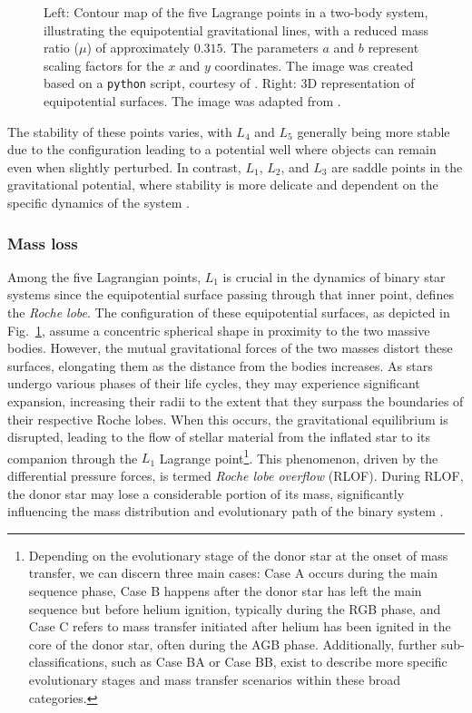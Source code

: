 \documentclass[main.tex]{subfiles}
\begin{document}
\begin{figure}[t!]
\begin{subfigure}{0.535\textwidth}
         \end{subfigure}
         \caption{Left: Contour map of the five Lagrange points in a two-body system, illustrating the equipotential gravitational lines, with a reduced mass ratio ($\mu$) of approximately $0.315$. The parameters $a$ and $b$ represent scaling factors for the $x$ and $y$ coordinates. The image was created based on a \texttt{python} script, courtesy of \cite{Zingale}.
         Right: 3D representation of equipotential surfaces. The image was adapted from \cite{Sluijs}.}
         \label{fig:eq_sur}
    \end{figure}

    The stability of these points varies, with $L_4$ and $L_5$ generally being more stable due to the configuration leading to a potential well where objects can remain even when slightly perturbed. In contrast, $L_1$, $L_2$, and $L_3$ are saddle points in the gravitational potential, where stability is more delicate and dependent on the specific dynamics of the system \citep[e.g.,][]{Szebehely, Celletti1990, Schwarz2012}. 

    \subsubsection{Mass loss}
    Among the five Lagrangian points, $L_1$ is crucial in the dynamics of binary star systems since the equipotential surface passing through that inner point, defines the \textit{Roche lobe}. The configuration of these equipotential surfaces, as depicted in Fig.~\ref{fig:eq_sur}, assume a concentric spherical shape in proximity to the two massive bodies. However, the mutual gravitational forces of the two masses distort these surfaces, elongating them as the distance from the bodies increases. As stars undergo various phases of their life cycles, they may experience significant expansion, increasing their radii to the extent that they surpass the boundaries of their respective Roche lobes. When this occurs, the gravitational equilibrium is disrupted, leading to the flow of stellar material from the inflated star to its companion through the $L_1$ Lagrange point\footnote{Depending on the evolutionary stage of the donor star at the onset of mass transfer, we can discern three main cases: Case A occurs during the main sequence phase, Case B happens after the donor star has left the main sequence but before helium ignition, typically during the RGB phase, and Case C refers to mass transfer initiated after helium has been ignited in the core of the donor star, often during the AGB phase. Additionally, further sub-classifications, such as Case BA or Case BB, exist to describe more specific evolutionary stages and mass transfer scenarios within these broad categories.}. This phenomenon, driven by the differential pressure forces, is termed \textit{Roche lobe overflow} (RLOF). During RLOF, the donor star may lose a considerable portion of its mass, significantly influencing the mass distribution and evolutionary path of the binary system \citep[e.g.,][]{temmink:aa23}.
\end{document}
